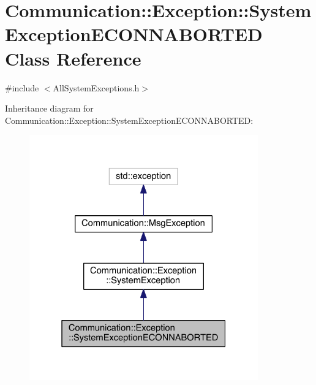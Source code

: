 \hypertarget{class_communication_1_1_exception_1_1_system_exception_e_c_o_n_n_a_b_o_r_t_e_d}{}\section{Communication\+:\+:Exception\+:\+:System\+Exception\+E\+C\+O\+N\+N\+A\+B\+O\+R\+T\+E\+D Class Reference}
\label{class_communication_1_1_exception_1_1_system_exception_e_c_o_n_n_a_b_o_r_t_e_d}


{\ttfamily \#include $<$All\+System\+Exceptions.\+h$>$}



Inheritance diagram for Communication\+:\+:Exception\+:\+:System\+Exception\+E\+C\+O\+N\+N\+A\+B\+O\+R\+T\+E\+D\+:\nopagebreak
\begin{figure}[H]
\begin{center}
\leavevmode
\includegraphics[width=280pt]{class_communication_1_1_exception_1_1_system_exception_e_c_o_n_n_a_b_o_r_t_e_d__inherit__graph}
\end{center}
\end{figure}



